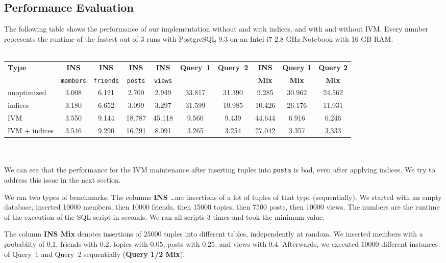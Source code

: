\documentclass[12pt]{article}
\begin{document}
\subsection{Performance Evaluation}
The following table shows the performance of our implementation  without and with indices, and with and without IVM. Every number represents the runtime of the fastest out of 3 runs with PostgreSQL 9.3 on an Intel i7 2.8 GHz Notebook with 16 GB RAM.
\\ \\
\noindent \begin{tabular}{ l | c c c c c c c c c }
\textbf{Type} & \textbf{INS}  & \textbf{INS}  & \textbf{INS}  & \textbf{INS} & \textbf{Query~1} & \textbf{Query~2} & \textbf{INS} & \textbf{Query 1} & \textbf{Query 2} \\
 & {\lstinline!members!} & {\lstinline!friends!} & {\lstinline!posts!} & {\lstinline!views!} & & & \textbf{Mix}  & \textbf{Mix} & \textbf{Mix} \\
 \hline
  unoptimized & 3.008 & 6.121 & 2.700 & 2.949 & 33.817 & 31.390 & 9.285 & 30.962 & 24.562 \\
  indices & 3.180 & 6.652 & 3.099 & 3.297 & 31.599 & 10.985 & 10.426 & 26.176 & 11.931 \\
  IVM & 3.550 & 9.144 & 18.787 & 45.118 & 9.560 & 9.439 & 44.644 & 6.916 & 6.246 \\
  IVM + indices & 3.546 & 9.290 & 16.291 & 8.091 & 3.265 & 3.254 & 27.042 & 3.357 & 3.333 \\
\end{tabular}
\\ \\
\noindent We can see that the performance for the IVM maintenance after inserting tuples into \lstinline{posts} is bad, even after applying indices. We try to address this issue in the next section.

We ran two types of benchmarks. The columns \textbf{INS} \ldots are insertions of a lot of tuples of that type (sequentially). We started with an empty database, inserted 10000 members, then 10000 friends, then 15000 topics, then 7500 posts, then 10000 views. The numbers are the runtime of the execution of the SQL script in seconds. We ran all scripts 3 times and took the minimum value.

The column \textbf{INS Mix} denotes insertions of 25000 tuples into different tables, independently at random. We inserted members with a probablity of $0.1$, friends with $0.2$, topics with $0.05$, posts with $0.25$, and views with $0.4$. Afterwards, we executed 10000 different instances of Query~1 and Query~2 sequentially (\textbf{Query 1/2 Mix}).
\end{document}
